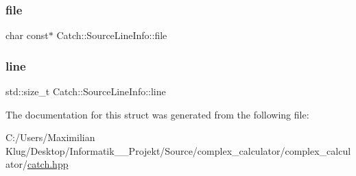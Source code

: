 \subsubsection{\texorpdfstring{file}{file}}
{\footnotesize\ttfamily char const$\ast$ Catch\+::\+Source\+Line\+Info\+::file}

\mbox{\label{struct_catch_1_1_source_line_info_a841e5d696c7b9cde24e45e61dd979c77}} 
\subsubsection{\texorpdfstring{line}{line}}
{\footnotesize\ttfamily std\+::size\+\_\+t Catch\+::\+Source\+Line\+Info\+::line}



The documentation for this struct was generated from the following file\+:\begin{DoxyCompactItemize}
\item 
C\+:/\+Users/\+Maximilian Klug/\+Desktop/\+Informatik\+\_\+\_\+\+Projekt/\+Source/complex\+\_\+calculator/complex\+\_\+calculator/\mbox{\hyperlink{catch_8hpp}{catch.\+hpp}}\end{DoxyCompactItemize}
